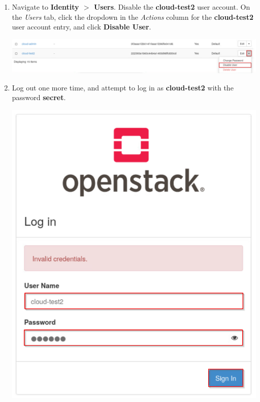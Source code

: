 \documentclass[letterpaper, 12pt]{article}
\begin{document}
\begin{enumerate}
    \item Navigate to \textbf{Identity $>$ Users}.
    Disable the \textbf{cloud-test2} user account.
    On the \textit{Users} tab, click the dropdown in the \textit{Actions} column for the \textbf{cloud-test2} user account entry, and click \textbf{Disable User}.

    \begin{center}
        \includegraphics[width=\linewidth]{images/part3/step13.png}
    \end{center}

    \item Log out one more time, and attempt to log in as \textbf{cloud-test2} with the password \textbf{secret}.

    \begin{center}
        \includegraphics[scale=0.5]{images/part3/step14.png}
    \end{center}


\end{enumerate}
\end{document}
